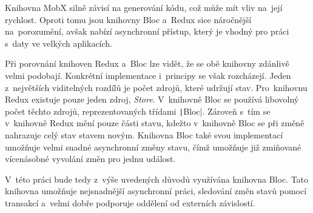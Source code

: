 Knihovna MobX silně závisí na generování kódu,
což může mít vliv na~její rychlost.
Oproti tomu jsou knihovny Bloc a~Redux sice náročnější na~porozumění,
avšak nabízí asynchronní přístup,
který je vhodný pro práci s~daty ve velkých aplikacích.

Při porovnání knihoven Redux a~Bloc lze vidět,
že se obě knihovny zdánlivě velmi podobají.
Konkrétní implementace i~principy se však rozcházejí.
Jeden z~největších viditelných rozdílů je počet zdrojů,
které udržují stav.
Pro~\mbox{knihovnu} Redux existuje pouze jeden zdroj, \emph{Store}.
V~knihovně Bloc se \mbox{používá} libovolný počet těchto zdrojů,
reprezentovaných třídami \texttt|Bloc|.
\mbox{Zároveň} s~tím se v~knihovně Redux mění pouze části stavu,
kdežto v~knihovně Bloc se při změně nahrazuje celý stav stavem novým.
Knihovna Bloc také svou implementací umožňuje velmi snadné asynchronní
změny stavu,
čímž umožňuje již zmiňované vícenásobné vyvolání změn pro jednu událost.

V~této práci bude tedy z~výše uvedených důvodů využívána knihovna Bloc.
Tato knihovna umožňuje nejsnadnější asynchronní práci,
sledování změn stavů pomocí transakcí
a~velmi dobře podporuje oddělení od externích závislostí.
